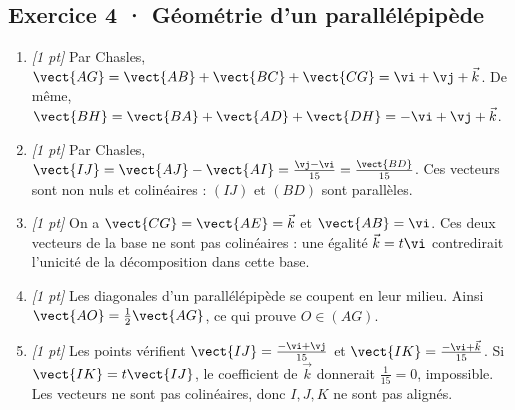 \subsection*{Exercice 4 · Géométrie d'un parallélépipède}\begin{enumerate}

\item \textit{[1 pt]} Par Chasles, $\vect{AG}=\vect{AB}+\vect{BC}+\vect{CG}=\vi +\vj +\vec k$. De même, $\vect{BH}=\vect{BA}+\vect{AD}+\vect{DH}=-\vi +\vj +\vec k$.

\item \textit{[1 pt]} Par Chasles, $\vect{IJ}=\vect{AJ}-\vect{AI}=\frac{\vj -\vi }{15}=\frac{\vect{BD}}{15}$. Ces vecteurs sont non nuls et colinéaires : $(IJ)$ et $(BD)$ sont parallèles.

\item \textit{[1 pt]} On a $\vect{CG}=\vect{AE}=\vec k$ et $\vect{AB}=\vi $. Ces deux vecteurs de la base ne sont pas colinéaires : une égalité $\vec k=t\vi $ contredirait l'unicité de la décomposition dans cette base.

\item \textit{[1 pt]} Les diagonales d'un parallélépipède se coupent en leur milieu. Ainsi $\vect{AO}=\frac12\vect{AG}$, ce qui prouve $O\in(AG)$.

\item \textit{[1 pt]} Les points vérifient $\vect{IJ}=\frac{-\vi +\vj }{15}$ et $\vect{IK}=\frac{-\vi +\vec k}{15}$. Si $\vect{IK}=t\vect{IJ}$, le coefficient de $\vec k$ donnerait $\frac{1}{15}=0$, impossible. Les vecteurs ne sont pas colinéaires, donc $I,J,K$ ne sont pas alignés.

\end{enumerate}

\fi

\fi

